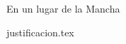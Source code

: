 \documentclass[a4paper,openany,oneside,12pt]{report}
\begin{document}

En un lugar de la Mancha 

{justificacion.tex}

%

	
\end{document}
